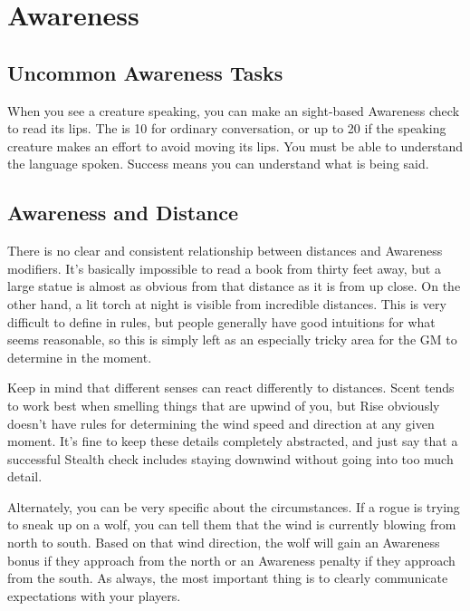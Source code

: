 \section{Awareness}

    \subsection{Uncommon Awareness Tasks}
         When you see a creature speaking, you can make an sight-based Awareness check to read its lips.
        The  is 10 for ordinary conversation, or up to 20 if the speaking creature makes an effort to avoid moving its lips.
        You must be able to understand the language spoken.
        Success means you can understand what is being said.

    \subsection{Awareness and Distance}
        There is no clear and consistent relationship between distances and Awareness modifiers.
        It's basically impossible to read a book from thirty feet away, but a large statue is almost as obvious from that distance as it is from up close.
        On the other hand, a lit torch at night is visible from incredible distances.
        This is very difficult to define in rules, but people generally have good intuitions for what seems reasonable, so this is simply left as an especially tricky area for the GM to determine in the moment.
        
        Keep in mind that different senses can react differently to distances.
        Scent tends to work best when smelling things that are upwind of you, but Rise obviously doesn't have rules for determining the wind speed and direction at any given moment.
        It's fine to keep these details completely abstracted, and just say that a successful Stealth check includes staying downwind without going into too much detail.

        Alternately, you can be very specific about the circumstances.
        If a rogue is trying to sneak up on a wolf, you can tell them that the wind is currently blowing from north to south.
        Based on that wind direction, the wolf will gain an Awareness bonus if they approach from the north or an Awareness penalty if they approach from the south.
        As always, the most important thing is to clearly communicate expectations with your players.

